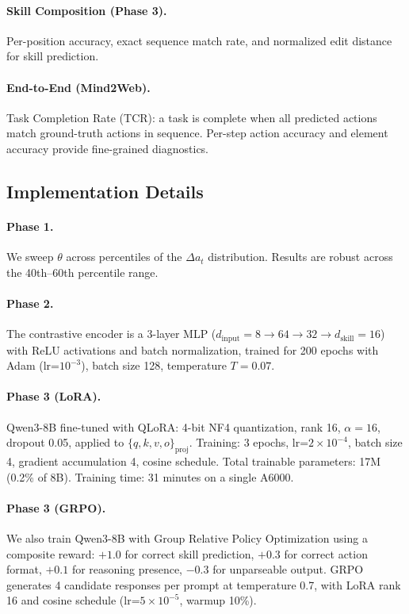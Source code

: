 \documentclass{article}
\begin{document}
\paragraph{Skill Composition (Phase 3).} Per-position accuracy, exact sequence match rate, and normalized edit distance for skill prediction.

\paragraph{End-to-End (Mind2Web).} Task Completion Rate (TCR): a task is complete when all predicted actions match ground-truth actions in sequence. Per-step action accuracy and element accuracy provide fine-grained diagnostics.

\subsection{Implementation Details}

\paragraph{Phase 1.} We sweep $\theta$ across percentiles of the $\Delta a_t$ distribution. Results are robust across the 40th--60th percentile range.

\paragraph{Phase 2.} The contrastive encoder is a 3-layer MLP ($d_{\text{input}} = 8 \to 64 \to 32 \to d_{\text{skill}} = 16$) with ReLU activations and batch normalization, trained for 200 epochs with Adam (lr=$10^{-3}$), batch size 128, temperature $T = 0.07$.

\paragraph{Phase 3 (LoRA).} Qwen3-8B fine-tuned with QLoRA: 4-bit NF4 quantization, rank 16, $\alpha = 16$, dropout 0.05, applied to $\{q, k, v, o\}_{\text{proj}}$. Training: 3 epochs, lr=$2 \times 10^{-4}$, batch size 4, gradient accumulation 4, cosine schedule. Total trainable parameters: 17M (0.2\% of 8B). Training time: 31 minutes on a single A6000.

\paragraph{Phase 3 (GRPO).} We also train Qwen3-8B with Group Relative Policy Optimization using a composite reward: $+1.0$ for correct skill prediction, $+0.3$ for correct action format, $+0.1$ for reasoning presence, $-0.3$ for unparseable output. GRPO generates 4 candidate responses per prompt at temperature 0.7, with LoRA rank 16 and cosine schedule (lr=$5 \times 10^{-5}$, warmup 10\%).
\end{document}
